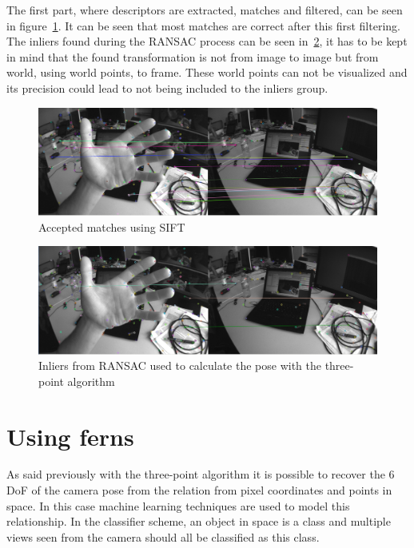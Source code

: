 The first part, where descriptors are extracted, matches and filtered, can be seen in figure~\ref{fig:3pt_matches}.  It can be seen that most matches are correct after this first filtering.\\

The inliers found during the RANSAC process can be seen in~\ref{fig:3pt_inliers}, it has to be kept in mind that the found transformation is not from image to image but from world, using world points, to frame. These world points can not be visualized and its precision could lead to not being included to the inliers group.\\

\begin{figure}[htpb]
  \centering
  \includegraphics[width=1.0\linewidth]{img/3pt_matches_1.png}
  \caption{Accepted matches using SIFT}
  \label{fig:3pt_matches}
\end{figure}


\begin{figure}[htpb]
  \centering
  \includegraphics[width=1.0\linewidth]{img/3pt_inliers_1.png}
  \caption{Inliers from RANSAC used to calculate the pose with the three-point algorithm }
  \label{fig:3pt_inliers}
\end{figure}


\section{Using ferns}
\label{sec:using_ferns}

As said previously with the three-point algorithm it is possible to recover the 6 DoF of the camera pose from the relation from pixel coordinates and points in space. In this case machine learning techniques are used to model this relationship. In the classifier scheme, an object in space is a class and multiple views seen from the camera should all be classified as this class.\\

